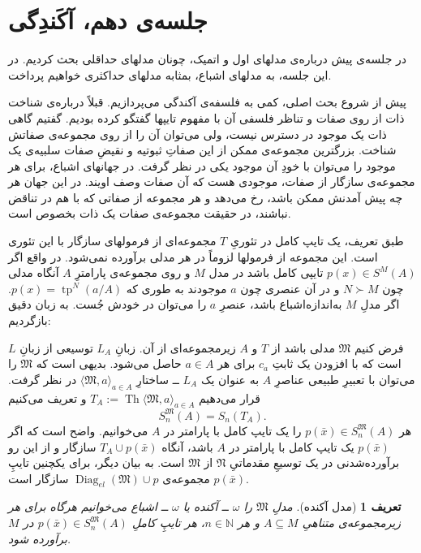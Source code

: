 \documentclass[12pt,a4paper]{report}
\theoremstyle{colorhead}
\newtheorem{defn}[thm]{تعریف}
\DeclareMathOperator{\Th}{Th}
\DeclareMathOperator{\diag}{Diag}
\DeclareMathOperator{\tp}{tp}
\begin{document}
\section{جلسه‌ی دهم، آکَندِگی}
در جلسه‌ی پیش درباره‌ی 
مدلهای اول و اتمیک، چونان
مدلهای حداقلی بحث کردیم. در این جلسه، به مدلهای اشباع، بمثابه مدلهای حداکثری خواهیم پرداخت.
\par 
پیش از شروع بحث اصلی، کمی به فلسفه‌ی آکندگی می‌پردازیم. 
قبلاً درباره‌ی شناخت ذات از روی صفات و تناظر فلسفی آن با مفهوم تایپها گفتگو کرده‌ بودیم. گفتیم
گاهی ذات یک موجود در دسترس نیست، ولی می‌توان آن را از روی مجموعه‌ی صفاتش شناخت.  بزرگترین مجموعه‌ی ممکن از این صفاتِ ثبوتیه  و نقیضِ‌ صفات سلبیه‌ی یک موجود را می‌توان با خودِ آن موجود یکی در نظر گرفت. در جهانهای اشباع، برای هر مجموعه‌ی سازگار از صفات، موجودی هست که آن صفات وصف اویند.
در این جهان هر چه پیش آمدنش ممکن باشد، رخ می‌دهد و هر مجموعه‌ از صفاتی که با هم در تناقض نباشند، در حقیقت مجموعه‌ی صفات یک ذات بخصوص است. 
\par 
طبق تعریف، یک تایپ کامل در تئوریِ
$T$
 مجموعه‌ای از فرمولهای سازگار با این تئوری است. این مجموعه از فرمولها لزوماً در هر مدلی برآورده نمی‌شود. در واقع اگر
 $p(x)\in S^M(A)$
 تایپی کامل باشد در مدل 
 $M$
 و روی مجموعه‌ی پارامترِ
 $A$
 آنگاه مدلی چون
 $N\succ M$
 و در آن عنصری چون
 $a$
 موجودند به طوری که
 $p(x)=\tp^N(a/A)$.
 اگر مدلِ
 $M$
 به‌اندازه‌اشباع باشد، عنصرِ
 $a$
 را می‌توان در خودش جُست. به زبان دقیق بازگردیم:
 \par 
فرض کنیم
$\mathfrak{M}$
مدلی باشد از
$T$
و 
$A$
زیرمجموعه‌ای از آن. زبانِ
$L_A$
توسیعی از زبانِ
$L$
است که با افزودن یک ثابتِ
$c_a$
برای هر
$a\in A$
حاصل می‌شود. بدیهی است که 
$\mathfrak{M}$
را می‌توان با تعبیرِ طبیعی عناصرِ
$A$
به عنوان یک
$L_A$
ــ‌
ساختارِ
$\langle \mathfrak{M},a\rangle_{a\in A}$
 در نظر گرفت. قرار می‌دهیم
\mbox{$T_A:=\Th\langle \mathfrak{M},a\rangle_{a\in A}$}
 و تعریف می‌کنیم
\[S_n^\mathfrak{M}(A)=S_n(T_A).\]
هر
$p(\bar{x})\in S^\mathfrak{M}_n(A)$
را یک تایپ کامل با پارامتر در
$A$
می‌خوانیم. واضح است که اگر
$p(\bar{x})$
یک تایپ کامل با پارامتر در
$A$
باشد، آنگاه
$T_A\cup p(\bar{x})$
سازگار و از این رو برآورده‌شدنی در یک توسیعِ مقدماتیِ
$\mathfrak{N}$
از
$\mathfrak{M}$
است. به بیان دیگر، برای یکچنین تایپِ
$p(\bar{x})$
مجموعه‌ی
$\diag_{el}(\mathfrak{M})\cup p$
سازگار است. 
\begin{defn}[مدل آکنده]
مدلِ
$\mathfrak{M}$
را
$\omega$ ــ
آکنده یا
$\omega$ ــ
اشباع 
می‌خوانیم هرگاه برای هر زیرمجموعه‌ی متناهیِ
$A\subseteq M$
و هر
$n\in \mathbb{N}$،
هر تایپِ کاملِ
$p(\bar{x})\in S_n^\mathfrak{M}(A)$
در
$M$
برآورده شود.
\end{defn}
\end{document}
